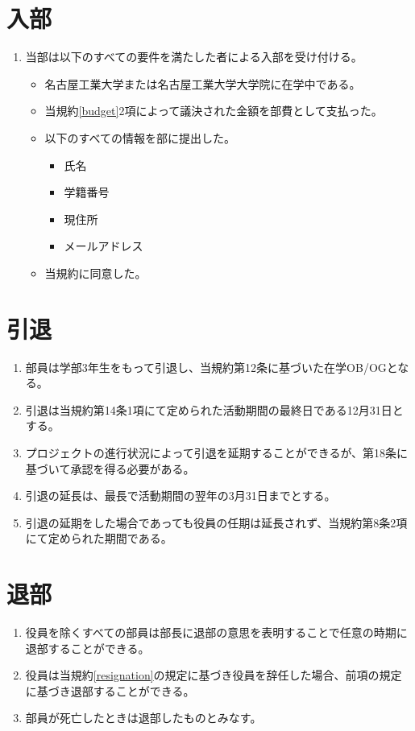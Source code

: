 \documentclass[12pt, unicode, a4paper]{ltjsreport}
\begin{document}
    \section{入部}
        \begin{enumerate}
            \item 当部は以下のすべての要件を満たした者による入部を受け付ける。
            \begin{itemize}
                \item 名古屋工業大学または名古屋工業大学大学院に在学中である。
                \item 当規約\ref{budget}2項によって議決された金額を部費として支払った。
                \item 以下のすべての情報を部に提出した。
                \begin{itemize}
                    \item 氏名
                    \item 学籍番号
                    \item 現住所
                    \item メールアドレス
                \end{itemize}
                \item 当規約に同意した。
            \end{itemize}
        \end{enumerate}
    
    \section{引退}
        \begin{enumerate}    
            \item 部員は学部3年生をもって引退し、当規約第12条に基づいた在学OB/OGとなる。
            \item 引退は当規約第14条1項にて定められた活動期間の最終日である12月31日とする。
            \item プロジェクトの進行状況によって引退を延期することができるが、第18条に基づいて承認を得る必要がある。
            \item 引退の延長は、最長で活動期間の翌年の3月31日までとする。
            \item 引退の延期をした場合であっても役員の任期は延長されず、当規約第8条2項にて定められた期間である。
        \end{enumerate}

    \section{退部}
        \begin{enumerate}
            \item 役員を除くすべての部員は部長に退部の意思を表明することで任意の時期に退部することができる。
            \item 役員は当規約\ref{resignation}の規定に基づき役員を辞任した場合、前項の規定に基づき退部することができる。
            \item 部員が死亡したときは退部したものとみなす。
        \end{enumerate}
\end{document}
